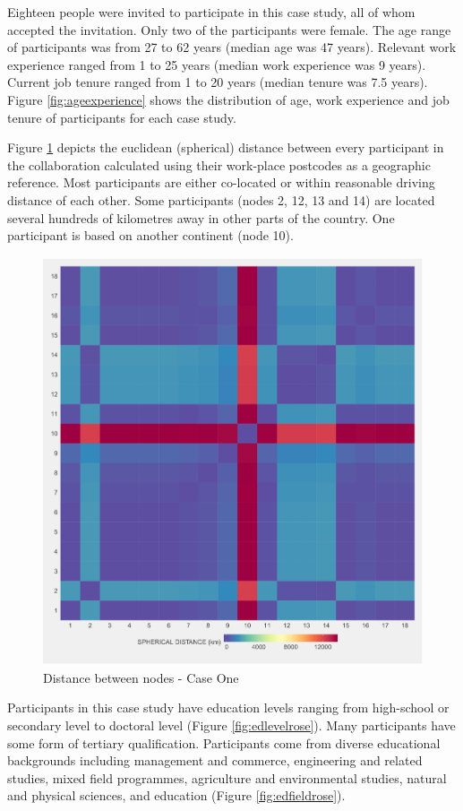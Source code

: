 Eighteen people were invited to participate in this case study, all of whom accepted the invitation. Only two of the participants were female. The age range of participants was from 27 to 62 years (median age was 47 years). Relevant work experience ranged from 1 to 25 years (median work experience was 9 years). Current job tenure ranged from 1 to 20 years (median tenure was 7.5 years). Figure \ref{fig:ageexperience} shows the distribution of age, work experience and job tenure of participants for each case study. \medskip

Figure \ref{fig:sphdistancecase1} depicts the euclidean (spherical) distance between every participant in the collaboration calculated using their work-place postcodes as a geographic reference. Most participants are either co-located or within reasonable driving distance of each other. Some participants (nodes 2, 12, 13 and 14) are located several hundreds of kilometres away in other parts of the country. One participant is based on another continent (node 10).\medskip

\begin{figure}
	\centering
	\includegraphics[width=0.7\linewidth]{Images/sph_distance_case1}
	\caption{Distance between nodes - Case One}
	\label{fig:sphdistancecase1}
\end{figure}

Participants in this case study have education levels ranging from high-school or secondary level to doctoral level (Figure \ref{fig:edlevelrose}). Many participants have some form of tertiary qualification. Participants come from diverse educational backgrounds including management and commerce, engineering and related studies, mixed field programmes, agriculture and environmental studies, natural and physical sciences, and education (Figure \ref{fig:edfieldrose}). 

